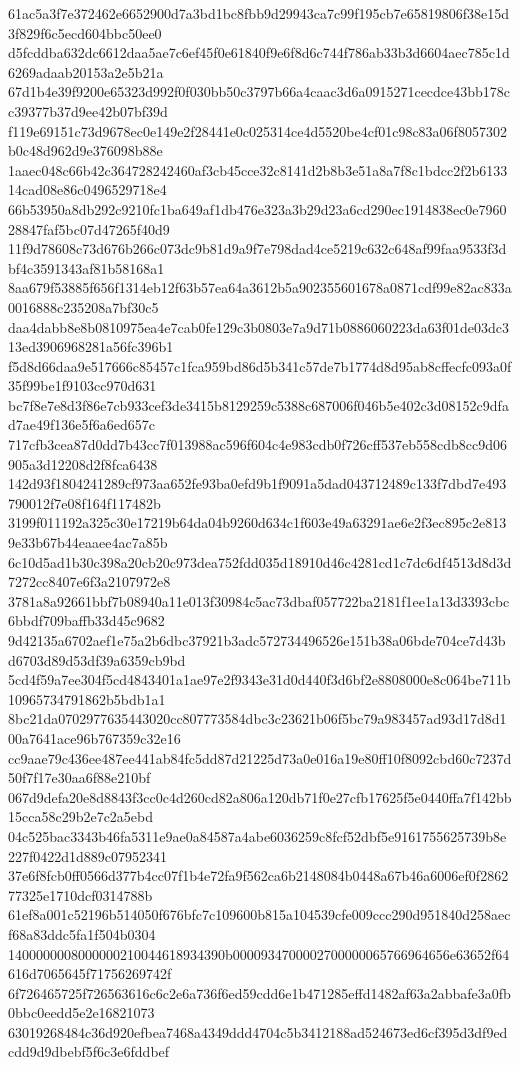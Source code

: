 {61ac5a3f7e372462e6652900d7a3bd1bc8fbb9d29943ca7c99f195cb7e65819806f38e15d3f829f6c5ecd604bbc50ee0
d5fcddba632dc6612daa5ae7c6ef45f0e61840f9e6f8d6c744f786ab33b3d6604aec785c1d6269adaab20153a2e5b21a
67d1b4e39f9200e65323d992f0f030bb50c3797b66a4caac3d6a0915271cecdce43bb178cc39377b37d9ee42b07bf39d
f119e69151c73d9678ec0e149e2f28441e0c025314ce4d5520be4cf01c98c83a06f8057302b0c48d962d9e376098b88e
1aaec048c66b42c364728242460af3cb45cce32c8141d2b8b3e51a8a7f8c1bdcc2f2b613314cad08e86c0496529718e4
66b53950a8db292c9210fc1ba649af1db476e323a3b29d23a6cd290ec1914838ec0e796028847faf5bc07d47265f40d9
11f9d78608c73d676b266c073dc9b81d9a9f7e798dad4ce5219c632c648af99faa9533f3dbf4c3591343af81b58168a1
8aa679f53885f656f1314eb12f63b57ea64a3612b5a902355601678a0871cdf99e82ac833a0016888c235208a7bf30c5
daa4dabb8e8b0810975ea4e7cab0fe129c3b0803e7a9d71b0886060223da63f01de03dc313ed3906968281a56fc396b1
f5d8d66daa9e517666c85457c1fca959bd86d5b341c57de7b1774d8d95ab8cffecfc093a0f35f99be1f9103cc970d631
bc7f8e7e8d3f86e7cb933cef3de3415b8129259c5388c687006f046b5e402c3d08152c9dfad7ae49f136e5f6a6ed657c
717cfb3cea87d0dd7b43cc7f013988ac596f604c4e983cdb0f726cff537eb558cdb8cc9d06905a3d12208d2f8fca6438
142d93f1804241289cf973aa652fe93ba0efd9b1f9091a5dad043712489c133f7dbd7e493790012f7e08f164f117482b
3199f011192a325c30e17219b64da04b9260d634c1f603e49a63291ae6e2f3ec895c2e8139e33b67b44eaaee4ac7a85b
6c10d5ad1b30c398a20cb20c973dea752fdd035d18910d46c4281cd1c7dc6df4513d8d3d7272cc8407e6f3a2107972e8
3781a8a92661bbf7b08940a11e013f30984c5ac73dbaf057722ba2181f1ee1a13d3393cbc6bbdf709baffb33d45c9682
9d42135a6702aef1e75a2b6dbc37921b3adc572734496526e151b38a06bde704ce7d43bd6703d89d53df39a6359cb9bd
5cd4f59a7ee304f5cd4843401a1ae97e2f9343e31d0d440f3d6bf2e8808000e8c064be711b10965734791862b5bdb1a1
8bc21da0702977635443020cc807773584dbc3c23621b06f5bc79a983457ad93d17d8d100a7641ace96b767359c32e16
cc9aae79c436ee487ee441ab84fc5dd87d21225d73a0e016a19e80ff10f8092cbd60c7237d50f7f17e30aa6f88e210bf
067d9defa20e8d8843f3cc0c4d260cd82a806a120db71f0e27cfb17625f5e0440ffa7f142bb15cca58c29b2e7c2a5ebd
04c525bac3343b46fa5311e9ae0a84587a4abe6036259c8fcf52dbf5e9161755625739b8e227f0422d1d889c07952341
37e6f8fcb0ff0566d377b4cc07f1b4e72fa9f562ca6b2148084b0448a67b46a6006ef0f286277325e1710dcf0314788b
61ef8a001c52196b514050f676bfc7c109600b815a104539cfe009ccc290d951840d258aecf68a83ddc5fa1f504b0304
1400000008000000210044618934390b0000934700002700000065766964656e63652f64616d7065645f71756269742f
6f726465725f726563616c6c2e6a736f6ed59cdd6e1b471285effd1482af63a2abbafe3a0fb0bbc0eedd5e2e16821073
63019268484c36d920efbea7468a4349ddd4704c5b3412188ad524673ed6cf395d3df9edcdd9d9dbebf5f6c3e6fddbef
}
